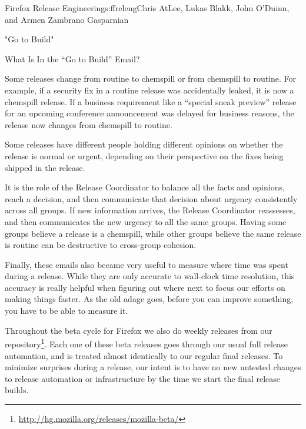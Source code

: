 \begin{aosachapter}{Firefox Release Engineering}{s:ffreleng}{Chris AtLee, Lukas Blakk, John O'Duinn, and Armen Zambrano Gasparnian}
\begin{aosasect1}{"Go to Build"}
\begin{aosasect2}{What Is In the ``Go to Build'' Email?}
\begin{aosaenumerate}
\begin{aosaenumerate2}
    \item Some releases change from routine to chemspill or
      from chemspill to routine. For example, if a security
      fix in a routine release was accidentally leaked, it is now
      a chemspill release. If a business requirement like a
      ``special sneak preview'' release for an upcoming
      conference announcement was delayed for business
      reasons, the release now changes from chemspill to
      routine.

    \item Some releases have different people holding different
      opinions on whether the release is normal or urgent,
      depending on their perspective on the fixes being shipped in the
      release.

  \end{aosaenumerate2}

\end{aosaenumerate}

It is the role of the Release Coordinator to balance all the facts and
opinions, reach a decision, and then communicate that decision about
urgency consistently across all groups. If new information arrives,
the Release Coordinator reassesses, and then communicates the new
urgency to all the same groups. Having some groups believe a release
is a chemspill, while other groups believe the same release is routine
can be destructive to cross-group cohesion.

Finally, these emails also became very useful to measure where time
was spent during a release.  While they are only accurate to
wall-clock time resolution, this accuracy is really helpful when
figuring out where next to focus our efforts on making things faster.
As the old adage goes, before you can improve something, you
have to be able to measure it.

Throughout the beta cycle for Firefox we also do weekly releases from
our 
repository\footnote{\url{http://hg.mozilla.org/releases/mozilla-beta/}}. Each
one of these beta releases goes through our usual full release
automation, and is treated almost identically to our regular final
releases. To minimize surprises during a release, our intent is to
have no new untested changes to release automation or
infrastructure by the time we start the final release builds.

\end{aosasect2}

\end{aosasect1}


\end{aosachapter}
